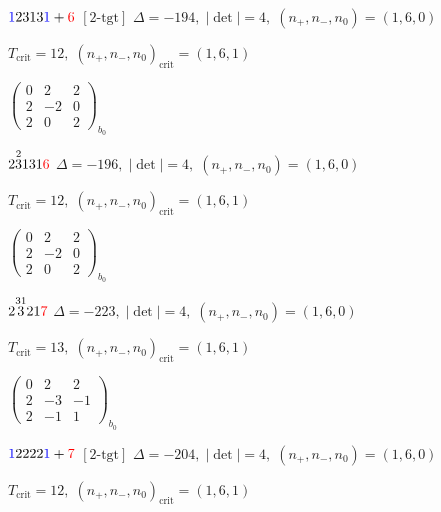 \documentclass[10pt]{article}
\begin{document}
$\textcolor{blue}{1}2313\textcolor{blue}{1}+\textcolor{red}{6}$ $\scriptstyle [2\text{-tgt}]$ \quad $\Delta=-194,\; |\det|=4,\; (n_+,n_-,n_0)=(1,6,0)$

\hspace{1em}$T_{\text{crit}}=12,\; (n_+,n_-,n_0)_{\text{crit}}=(1,6,1)$

\hspace{2em}$\left(\begin{smallmatrix}0 & 2 & 2 \\ 2 & -2 & 0 \\ 2 & 0 & 2\end{smallmatrix}\right)_{\!b_0}$

\smallskip

$2\overset{2}{3}131\textcolor{red}{6}$ \quad $\Delta=-196,\; |\det|=4,\; (n_+,n_-,n_0)=(1,6,0)$

\hspace{1em}$T_{\text{crit}}=12,\; (n_+,n_-,n_0)_{\text{crit}}=(1,6,1)$

\hspace{2em}$\left(\begin{smallmatrix}0 & 2 & 2 \\ 2 & -2 & 0 \\ 2 & 0 & 2\end{smallmatrix}\right)_{\!b_0}$

\smallskip

$2\overset{31}{3}21\textcolor{red}{7}$ \quad $\Delta=-223,\; |\det|=4,\; (n_+,n_-,n_0)=(1,6,0)$

\hspace{1em}$T_{\text{crit}}=13,\; (n_+,n_-,n_0)_{\text{crit}}=(1,6,1)$

\hspace{2em}$\left(\begin{smallmatrix}0 & 2 & 2 \\ 2 & -3 & -1 \\ 2 & -1 & 1\end{smallmatrix}\right)_{\!b_0}$

\smallskip

$\textcolor{blue}{1}2222\textcolor{blue}{1}+\textcolor{red}{7}$ $\scriptstyle [2\text{-tgt}]$ \quad $\Delta=-204,\; |\det|=4,\; (n_+,n_-,n_0)=(1,6,0)$

\hspace{1em}$T_{\text{crit}}=12,\; (n_+,n_-,n_0)_{\text{crit}}=(1,6,1)$
\end{document}
